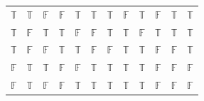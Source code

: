\documentclass[a4paper,12pt]{article}
\begin{document}
\begin{enumerate}
\begin{table}[htp]
\begin{tabular}{|c|c|c|c|c|c|c|c|c|c|c|c|}
$\mathbb{T}$                & $\mathbb{T}$             & $\mathbb{F}$             & $\mathbb{F}$                  & $\mathbb{T}$                  & $\mathbb{T}$                          & $\mathbb{T}$                                & $\mathbb{F}$                              & $\mathbb{T}$                              & $\mathbb{F}$                                    & $\mathbb{T}$                                                                     & $\mathbb{T}$                         \\
$\mathbb{T}$                & $\mathbb{F}$             & $\mathbb{T}$             & $\mathbb{T}$                  & $\mathbb{F}$                  & $\mathbb{F}$                          & $\mathbb{T}$                                & $\mathbb{T}$                              & $\mathbb{F}$                              & $\mathbb{T}$                                    & $\mathbb{T}$                                                                     & $\mathbb{T}$                         \\
$\mathbb{T}$                & $\mathbb{F}$             & $\mathbb{F}$             & $\mathbb{T}$                  & $\mathbb{T}$                  & $\mathbb{F}$                          & $\mathbb{F}$                                & $\mathbb{T}$                              & $\mathbb{T}$                              & $\mathbb{F}$                                    & $\mathbb{F}$                                                                     & $\mathbb{T}$                         \\
$\mathbb{F}$                & $\mathbb{T}$             & $\mathbb{T}$             & $\mathbb{F}$                  & $\mathbb{F}$                  & $\mathbb{T}$                          & $\mathbb{T}$                                & $\mathbb{T}$                              & $\mathbb{T}$                              & $\mathbb{F}$                                    & $\mathbb{F}$                                                                     & \cellcolor[HTML]{FFCCC9}$\mathbb{F}$ \\
$\mathbb{F}$                & $\mathbb{T}$             & $\mathbb{F}$             & $\mathbb{F}$                  & $\mathbb{T}$                  & $\mathbb{T}$                          & $\mathbb{T}$                                & $\mathbb{T}$                              & $\mathbb{T}$                              & $\mathbb{F}$                                    & $\mathbb{F}$                                                                     & \cellcolor[HTML]{FFCCC9}$\mathbb{F}$ \\

\end{tabular}
\end{table}
\end{enumerate}
\end{document}
